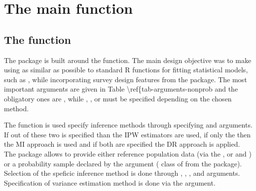 \documentclass[
]{jss}
\begin{document}
\section{The main function}\label{sec-package}

\subsection[The nonprob function]{The  function}

The  package is built around the 
function. The main design objective was to make using  as
similar as possible to standard R functions for fitting statistical
models, such as , while incorporating survey design
features from the  package. The most important arguments are
given in Table \textbackslash ref\{tab-arguments-nonprob and the
obligatory ones are , while , ,
or  must be specified depending on the chosen method.

The  function is used specify inference methods through
specifying  and  arguments. If out of
these two  is specified than the IPW estimators are
used, if only the  then the MI approach is used and if
both are specified the DR approach is applied. The package allows to
provide either reference population data (via the , or
 and ) or a probability sample declared
by the  argument ( class of from the
 package). Selection of the speficic inference method is
done through , ,
,  and
 arguments. Specification of variance estimation
method is done via the  argument.
\end{document}
